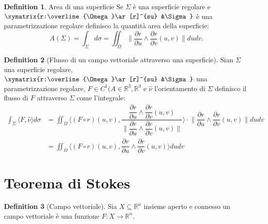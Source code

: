 \documentclass[leqno]{article}
\theoremstyle{definition}
\newtheorem{definition}{Definition}[section]
\numberwithin{equation}{section}
\theoremstyle{remark}
\begin{document}
	\begin{definition}{Area di una superficie}
		Se $\Sigma$ è una superficie regolare e $\xymatrix{r:\overline{\Omega}\ar[r]^{su} &\Sigma}$ è una parametrizzazione regolare definisco la quantità area della superficie:
		\begin{equation}
			A(\Sigma)=\int_{\Sigma}d \sigma = \iint_{\overline{\Omega}}\lVert \dfrac{\partial r}{\partial u}\wedge \dfrac{\partial r}{\partial v}(u,v)\rVert du dv.
		\end{equation}
	\end{definition}
	
	\begin{definition}[Flusso di un campo vettoriale attraverso una superficie]
		Sian $\Sigma$ una superficie regolare, $\xymatrix{r:\overline{\Omega}\ar[r]^{su} &\Sigma}$ una parametrizzazione regolare, $F\in C^1(A\in \mathbb{R}^3, \mathbb{R}^3$ e $\hat{\nu}$ l'orientamento di $\Sigma$ definisco il flusso di $F$ attraverso $\Sigma$ come l'integrale: 
		\begin{equation}
			\begin{aligned}
				\int_{\Sigma} \langle F, \hat{\nu}\rangle d \sigma &= \iint_{\overline{\Omega}}\langle \left(F \circ r\right) (u,v),\dfrac{ \dfrac{\partial r}{\partial u}\wedge \dfrac {\partial r}{\partial v} (u,v) }{\lVert \dfrac{\partial r}{\partial u}\wedge \dfrac{\partial r}{\partial v} (u,v) \rVert}\rangle \cdot  \lVert \dfrac{\partial r}{\partial u}\wedge \dfrac{\partial r}{\partial v} (u,v) \rVert dudv \\ &=\iint_{\overline{\Omega}}\langle \left(F \circ r\right) (u,v), \dfrac{\partial r}{\partial u}\wedge \dfrac {\partial r}{\partial v} (u,v) \rangle dudv
			\end{aligned}
		\end{equation}
		\end {definition}
		
		\section{Teorema di Stokes}
		
		
		\begin{definition}[Campo vettoriale]
			Sia $X \subseteq \mathbb{R}^n$ insieme aperto e connesso un campo vettoriale è una funzione $F:X \to \mathbb{R}^n$.
		\end{definition}
		
\end{document}
